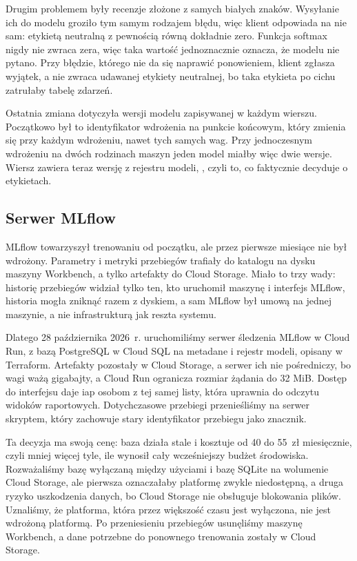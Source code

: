 

Drugim problemem były recenzje złożone z samych białych znaków.
Wysyłanie ich do modelu groziło tym samym rodzajem błędu, więc klient odpowiada na nie sam: etykietą neutralną z pewnością równą dokładnie zero.
Funkcja softmax nigdy nie zwraca zera, więc taka wartość jednoznacznie oznacza, że modelu nie pytano.
Przy błędzie, którego nie da się naprawić ponowieniem, klient zgłasza wyjątek, a nie zwraca udawanej etykiety neutralnej, bo taka etykieta po cichu zatrułaby tabelę zdarzeń.

Ostatnia zmiana dotyczyła wersji modelu zapisywanej w każdym wierszu.
Początkowo był to identyfikator wdrożenia na punkcie końcowym, który zmienia się przy każdym wdrożeniu, nawet tych samych wag.
Przy jednoczesnym wdrożeniu na dwóch rodzinach maszyn jeden model miałby więc dwie wersje.
Wiersz zawiera teraz wersję z rejestru modeli, , czyli to, co faktycznie decyduje o etykietach.

\subsection{Serwer MLflow}
\label{sec:impl-mlflow}

MLflow towarzyszył trenowaniu od początku, ale przez pierwsze miesiące nie był wdrożony.
Parametry i metryki przebiegów trafiały do katalogu na dysku maszyny Workbench, a tylko artefakty do Cloud Storage.
Miało to trzy wady: historię przebiegów widział tylko ten, kto uruchomił maszynę i interfejs MLflow, historia mogła zniknąć razem z dyskiem, a sam MLflow był umową na jednej maszynie, a nie infrastrukturą jak reszta systemu.

Dlatego 28 października 2026~r. uruchomiliśmy serwer śledzenia MLflow w Cloud Run, z bazą PostgreSQL w Cloud SQL na metadane i rejestr modeli, opisany w Terraform.
Artefakty pozostały w Cloud Storage, a serwer ich nie pośredniczy, bo wagi ważą gigabajty, a Cloud Run ogranicza rozmiar żądania do 32 MiB.
Dostęp do interfejsu daje \ac{iap} osobom z tej samej listy, która uprawnia do odczytu widoków raportowych.
Dotychczasowe przebiegi przenieśliśmy na serwer skryptem, który zachowuje stary identyfikator przebiegu jako znacznik.

Ta decyzja ma swoją cenę: baza działa stale i kosztuje od 40 do 55~zł miesięcznie, czyli mniej więcej tyle, ile wynosił cały wcześniejszy budżet środowiska.
Rozważaliśmy bazę wyłączaną między użyciami i bazę SQLite na wolumenie Cloud Storage, ale pierwsza oznaczałaby platformę zwykle niedostępną, a druga ryzyko uszkodzenia danych, bo Cloud Storage nie obsługuje blokowania plików.
Uznaliśmy, że platforma, która przez większość czasu jest wyłączona, nie jest wdrożoną platformą.
Po przeniesieniu przebiegów usunęliśmy maszynę Workbench, a dane potrzebne do ponownego trenowania zostały w Cloud Storage.

